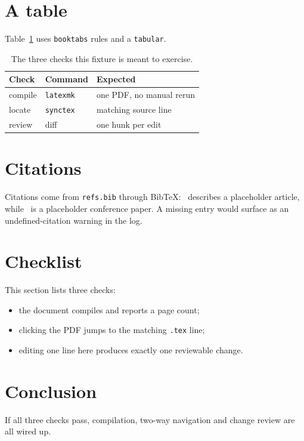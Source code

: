 \documentclass[11pt]{article}
\begin{document}
\section{A table}
Table~\ref{tab:checks} uses \texttt{booktabs} rules and a \texttt{tabular}.
\begin{table}[htbp]
  \centering
  \begin{tabular}{lll}
    \toprule
    Check & Command & Expected \\
    \midrule
    compile & \texttt{latexmk} & one PDF, no manual rerun \\
    locate & \texttt{synctex} & matching source line \\
    review & diff & one hunk per edit \\
    \bottomrule
  \end{tabular}
  \caption{The three checks this fixture is meant to exercise.}
  \label{tab:checks}
\end{table}

\section{Citations}
Citations come from \texttt{refs.bib} through BibTeX:~\cite{sample2024} describes
a placeholder article, while~\cite{sample2023} is a placeholder conference paper.
A missing entry would surface as an undefined-citation warning in the log.

\section{Checklist}
This section lists three checks:
\begin{itemize}
  \item the document compiles and reports a page count;
  \item clicking the PDF jumps to the matching \texttt{.tex} line;
  \item editing one line here produces exactly one reviewable change.
\end{itemize}



\section{Conclusion}
If all three checks pass, compilation, two-way navigation and change review are
all wired up.



\end{document}
